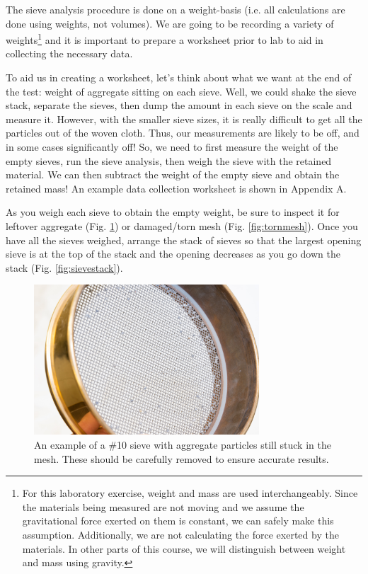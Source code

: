\documentclass[12pt]{article}
\begin{document}
The sieve analysis procedure is done on a weight-basis (i.e. all calculations are done using weights, not volumes). We are going to be recording a variety of weights\footnote{For this laboratory exercise, weight and mass are used interchangeably. Since the materials being measured are not moving and we assume the gravitational force exerted on them is constant, we can safely make this assumption. Additionally, we are not calculating the force exerted by the materials. In other parts of this course, we will distinguish between weight and mass using gravity.} and it is important to prepare a worksheet prior to lab to aid in collecting the necessary data.

To aid us in creating a worksheet, let's think about what we want at the end of the test: weight of aggregate sitting on each sieve. Well, we could shake the sieve stack, separate the sieves, then dump the amount in each sieve on the scale and measure it. However, with the smaller sieve sizes, it is really difficult to get all the particles out of the woven cloth. Thus, our measurements are likely to be off, and in some cases significantly off! So, we need to first measure the weight of the empty sieves, run the sieve analysis, then weigh the sieve with the retained material. We can then subtract the weight of the empty sieve and obtain the retained mass! An example data collection worksheet is shown in Appendix A.

As you weigh each sieve to obtain the empty weight, be sure to inspect it for leftover aggregate (Fig. \ref{fig:leftoveragg}) or damaged/torn mesh (Fig. \ref{fig:tornmesh}). Once you have all the sieves weighed, arrange the stack of sieves so that the largest opening sieve is at the top of the stack and the opening decreases as you go down the stack (Fig. \ref{fig:sievestack}).

\begin{figure}[H]
    \centering
    \includegraphics[width=0.75\textwidth]{GEO_5708.jpg}
    \caption{An example of a \#10 sieve with aggregate particles still stuck in the mesh. These should be carefully removed to ensure accurate results.}
    \label{fig:leftoveragg}
\end{figure}
\end{document}
